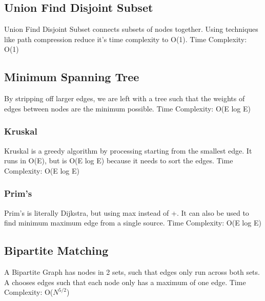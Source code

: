 \documentclass{article}
\begin{document}
\subsection{Union Find Disjoint Subset}
\begin{flushleft}
Union Find Disjoint Subset connects subsets of nodes together.
Using techniques like path compression reduce it's time complexity to O(1).
\newline
Time Complexity: O(1)
\end{flushleft}


\subsection{Minimum Spanning Tree}
\begin{flushleft}
By stripping off larger edges, we are left with a tree such that
the weights of edges between nodes are the minimum possible.
\newline
Time Complexity: O(E log E)
\end{flushleft}

\subsubsection{Kruskal}
\begin{flushleft}
Kruskal is a greedy algorithm by processing starting from the smallest edge.
It runs in O(E), but is O(E log E) because it needs to sort the edges.
\newline
Time Complexity: O(E log E)
\end{flushleft}


\subsubsection{Prim's}
\begin{flushleft}
Prim's is literally Dijkstra, but using max instead of +.
It can also be used to find minimum maximum edge from a single source.
\newline
Time Complexity: O(E log E)
\end{flushleft}


\subsection{Bipartite Matching}
\begin{flushleft}
A Bipartite Graph has nodes in 2 sets, such that edges only run across both sets.
A chooses edges such that each node only has a maximum of one edge.
\newline
Time Complexity: O($N^{5/2}$)
\end{flushleft}

\end{document}
